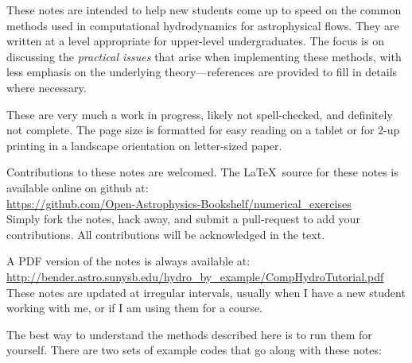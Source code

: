 

These notes are intended to help new students come up to speed on the
common methods used in computational hydrodynamics for astrophysical
flows.  They are written at a level appropriate for upper-level
undergraduates.  The focus is on discussing the {\em practical issues}
that arise when implementing these methods, with less emphasis on the
underlying theory---references are provided to fill in details where
necessary.

These are very much a work in progress, likely not spell-checked, and
definitely not complete.  The page size is formatted for easy reading
on a tablet or for 2-up printing in a landscape orientation on
letter-sized paper.  

Contributions to these notes are welcomed.  The \LaTeX\ source
for these notes is available online on github at: \\[0.25em]
%
\url{https://github.com/Open-Astrophysics-Bookshelf/numerical_exercises} \\[0.25em]
%
Simply fork the notes, hack away, and submit a pull-request to add
your contributions.  All contributions will be acknowledged in the text.


A PDF version of the notes is always available
at: \\[0.25em]
%
\url{http://bender.astro.sunysb.edu/hydro_by_example/CompHydroTutorial.pdf} \\[0.25em]
%
These notes are updated at irregular intervals, usually when I have a
new student working with me, or if I am using them for a course.

The best way to understand the methods described here is to run
them for yourself.  There are two sets of example codes that
go along with these notes:

